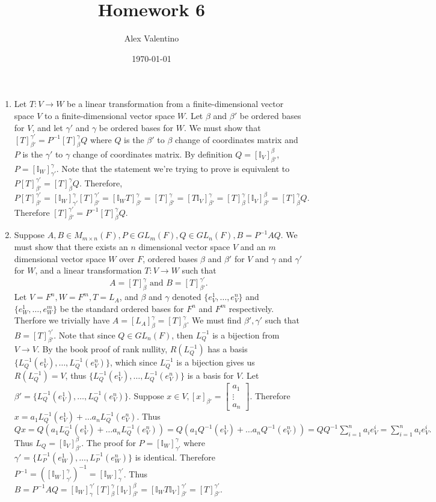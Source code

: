 \documentclass[12pt, letterpaper]{article}
\date{\today}
\author{Alex Valentino}
\title{Homework 6}
\begin{document}
	\begin{enumerate}
		\item Let $T: V \to W$ be a linear transformation from a finite-dimensional vector space $V$ to a finite-dimensional vector space $W$.  Let $
		\beta$ and $\beta'$ be ordered bases for $V$, and let $\gamma'$ and $\gamma$ be ordered bases for $W$.  We must show that $[T]^{\gamma'}_{\beta'} = P^{-1}[T]^\gamma_\beta Q$ where $Q$ is the $\beta'$ to $\beta$ change of coordinates matrix and $P$ is the $\gamma'$ to $\gamma$ change of coordinates matrix.  By definition $Q = [\mathbb{I}_V]^{\beta}_{\beta'}$, $P = [\mathbb{I}_W]^{\gamma}_{\gamma'}$.  Note that the statement we're trying to prove is equivalent to $P [T]^{\gamma'}_{\beta'} = [T]^\gamma_\beta Q$.  Therefore, 
		$$
					P [T]^{\gamma'}_{\beta'} = [\mathbb{I}_W]^{\gamma}_{\gamma'} [T]^{\gamma'}_{\beta'} = [\mathbb{I}_W T]^\gamma_{\beta'} = [T]^\gamma_{\beta'} = [T \mathbb{I}_V]^\gamma_{\beta'} = [T]^{\gamma}_\beta [\mathbb{I}_V]^{\beta}_{\beta'} = [T]^\gamma_\beta Q.
		$$  
		Therefore $[T]^{\gamma'}_{\beta'} = P^{-1}[T]^\gamma_\beta Q$. 
		
		\newpage
		\item Suppose $A,B \in M_{m \times n}(F), P \in GL_m (F), Q \in GL_n (F), B = P^{-1} A Q$.  We must show that there exists an $n$ dimensional vector space $V$ and an $m$ dimensional vector space $W$ over $F$, ordered bases $\beta$ and $\beta'$ for $V$ and $\gamma$ and $\gamma'$ for $W$, and a linear transformation $T: V \to W$ such that $$A = [T]^{\gamma}_\beta \text{ and } B = [T]^{\gamma'}_{\beta'}.$$
		Let $V = F^n, W= F^m, T = L_A$, and $\beta$ and $\gamma$ denoted $\{e_V^1,\ldots,e_V^n\}$ and $\{e_W^1,\ldots,e_W^m\}$ be the standard ordered bases for $F^n$ and $F^m$ respectively.  Therfore we trivially have $A = [L_A]^{\gamma}_{\beta} = [T]^{\gamma}_{\beta}$.  We must find $\beta', \gamma'$ such that $B = [T]_{\beta'}^{\gamma'}$.  Note that since $Q \in GL_n(F)$, then $L_Q^{-1}$ is a bijection from $V \to V$.  By the book proof of rank nullity, $R(L_Q^{-1})$ has a basis $\{L_Q^{-1}(e_V^1),\ldots,L_Q^{-1}(e_V^n)\}$, which since $L_Q^{-1}$ is a bijection gives us $R(L_Q^{-1}) = V$, thus $\{L_Q^{-1}(e_V^1),\ldots,L_Q^{-1}(e_V^n)\}$ is a basis for $V$.  Let $\beta' = \{L_Q^{-1}(e_V^1),\ldots,L_Q^{-1}(e_V^n)\}$.  Suppose $x \in V, [x]_{\beta'} = \begin{bmatrix}a_1\\ \vdots \\ a_n\end{bmatrix} $.  Therefore $x = a_1 L_Q^{-1}(e_V^1) + \ldots  a_n L_Q^{-1}(e_V^n)$.  Thus $Qx = Q(a_1 L_Q^{-1}(e_V^1) + \ldots  a_n L_Q^{-1}(e_V^n)) = Q(a_1 Q^{-1}(e_V^1) + \ldots  a_n Q^{-1}(e_V^n)) = QQ^{-1} \sum_{i=1}^n a_i e_V^i = \sum_{i=1}^n a_i e_V^i.$  Thus $L_Q = [\mathbb{I}_V]_{\beta'}^{\beta}$.  The proof for $P = [\mathbb{I}_W]_{\gamma'}^{\gamma}$ where $\gamma' = \{L_P^{-1}(e_W^1),\ldots,L_P^{-1}(e_W^n)\}$ is identical.  Therefore $P^{-1} = ([\mathbb{I}_W]_{\gamma'}^{\gamma})^{-1} = [\mathbb{I}_W]_{\gamma}^{\gamma'}$.  Thus $B = P^{-1}A Q =[\mathbb{I}_W]_{\gamma}^{\gamma'} [T]^\gamma_\beta  [\mathbb{I}_V]_{\beta'}^{\beta} = [\mathbb{I}_W T \mathbb{I}_V]^{\gamma'}_{\beta'} = [T]^{\gamma'}_{\beta'}$.
		

\end{enumerate}
\end{document}
